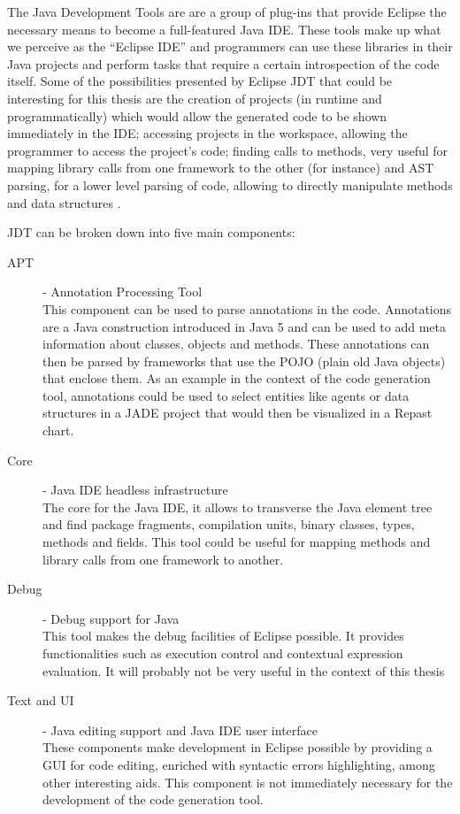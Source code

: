 	The Java Development Tools are are a group of plug-ins that provide Eclipse the necessary means to become a full-featured Java IDE.
	These tools make up what we perceive as the ``Eclipse IDE'' and programmers can use these libraries in their Java projects and perform tasks that require a certain introspection of the code itself. Some of the possibilities presented by Eclipse JDT that could be interesting for this thesis are the creation of projects (in runtime and programmatically) which would allow the generated code to be shown immediately in the IDE; accessing projects in the workspace, allowing the programmer to access the project's code; finding calls to methods, very useful for mapping library calls from one framework to the other (for instance) and AST parsing, for a lower level parsing of code, allowing to directly manipulate methods and data structures \cite{eclipseJDT}.

	JDT can be broken down into five main components: 

	\begin{description}
		\item[APT] - Annotation Processing Tool\hfill \\
  			This component can be used to parse annotations in the code. Annotations are a Java construction introduced in Java 5 and can be used to add meta information about classes, objects and methods. These annotations can then be parsed by frameworks that use the POJO (plain old Java objects) that enclose them. As an example in the context of the code generation tool, annotations could be used to select entities like agents or data structures in a JADE project that would then be visualized in a Repast chart.
		\item[Core] - Java IDE headless infrastructure \hfill \\
  			The core for the Java IDE, it allows to transverse the Java element tree and find package fragments, compilation units, binary classes, types, methods and fields. This tool could be useful for mapping methods and library calls from one framework to another.
		\item[Debug] - Debug support for Java\hfill \\
  			This tool makes the debug facilities of Eclipse possible. It provides functionalities such as execution control and contextual expression evaluation. It will probably not be very useful in the context of this thesis
		\item[Text and UI] - Java editing support and Java IDE user interface \hfill \\
  			These components make development in Eclipse possible by providing a GUI for code editing, enriched with syntactic errors highlighting, among other interesting aids. This component is not immediately necessary for the development of the code generation tool.
	\end{description}


